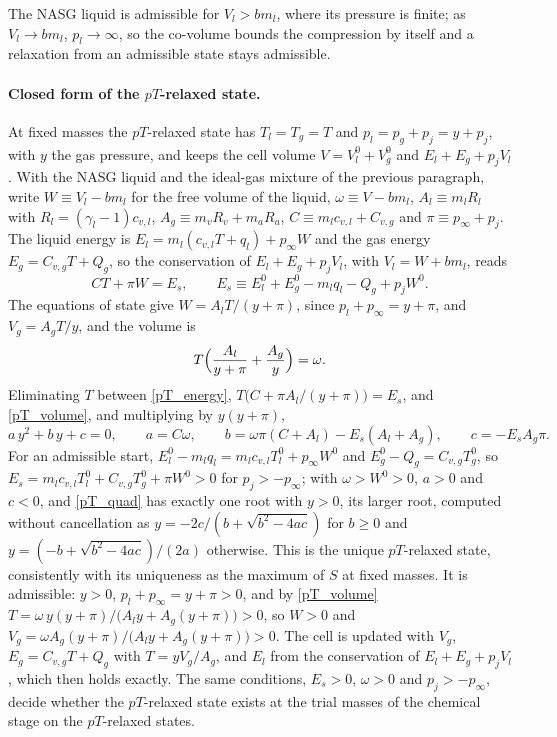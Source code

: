 The NASG liquid is admissible for $V_l>bm_l$, where its pressure is finite; as $V_l\to bm_l$, $p_l\to\infty$, so the co-volume bounds the compression by itself and a relaxation from an admissible state stays admissible.

\paragraph{Closed form of the $pT$-relaxed state.}
At fixed masses the $pT$-relaxed state has $T_l=T_g=T$ and $p_l=p_g+p_{j}=y+p_{j}$, with $y$ the gas pressure, and keeps the cell volume $V=V_l^0+V_g^0$ and $E_l+E_g+p_{j}V_l$. With the NASG liquid and the ideal-gas mixture of the previous paragraph, write $W\equiv V_l-bm_l$ for the free volume of the liquid, $\omega\equiv V-bm_l$, $A_l\equiv m_lR_l$ with $R_l=(\gamma_l-1)c_{v,l}$, $A_g\equiv m_vR_v+m_aR_a$, $C\equiv m_lc_{v,l}+C_{v,g}$ and $\pi\equiv p_\infty+p_{j}$. The liquid energy is $E_l=m_l(c_{v,l}T+q_l)+p_\infty W$ and the gas energy $E_g=C_{v,g}T+Q_g$, so the conservation of $E_l+E_g+p_{j}V_l$, with $V_l=W+bm_l$, reads
\begin{equation}\label{pT_energy}
CT+\pi W=E_s,\qquad E_s\equiv E_l^0+E_g^0-m_lq_l-Q_g+p_{j}W^0 .
\end{equation}
The equations of state give $W=A_lT/(y+\pi)$, since $p_l+p_\infty=y+\pi$, and $V_g=A_gT/y$, and the volume is
\begin{equation}\label{pT_volume}
T\Bigl(\frac{A_l}{y+\pi}+\frac{A_g}{y}\Bigr)=\omega .
\end{equation}
Eliminating $T$ between \eqref{pT_energy}, $T\bigl(C+\pi A_l/(y+\pi)\bigr)=E_s$, and \eqref{pT_volume}, and multiplying by $y(y+\pi)$,
\begin{equation}\label{pT_quad}
a\,y^2+b\,y+c=0,\qquad a=C\omega,\qquad b=\omega\pi(C+A_l)-E_s(A_l+A_g),\qquad c=-E_sA_g\pi .
\end{equation}
For an admissible start, $E_l^0-m_lq_l=m_lc_{v,l}T_l^0+p_\infty W^0$ and $E_g^0-Q_g=C_{v,g}T_g^0$, so $E_s=m_lc_{v,l}T_l^0+C_{v,g}T_g^0+\pi W^0>0$ for $p_{j}>-p_\infty$; with $\omega>W^0>0$, $a>0$ and $c<0$, and \eqref{pT_quad} has exactly one root with $y>0$, its larger root, computed without cancellation as $y=-2c/(b+\sqrt{b^2-4ac})$ for $b\ge0$ and $y=(-b+\sqrt{b^2-4ac})/(2a)$ otherwise. This is the unique $pT$-relaxed state, consistently with its uniqueness as the maximum of $S$ at fixed masses. It is admissible: $y>0$, $p_l+p_\infty=y+\pi>0$, and by \eqref{pT_volume} $T=\omega\,y(y+\pi)/\bigl(A_ly+A_g(y+\pi)\bigr)>0$, so $W>0$ and $V_g=\omega A_g(y+\pi)/\bigl(A_ly+A_g(y+\pi)\bigr)>0$. The cell is updated with $V_g$, $E_g=C_{v,g}T+Q_g$ with $T=yV_g/A_g$, and $E_l$ from the conservation of $E_l+E_g+p_{j}V_l$, which then holds exactly. The same conditions, $E_s>0$, $\omega>0$ and $p_{j}>-p_\infty$, decide whether the $pT$-relaxed state exists at the trial masses of the chemical stage on the $pT$-relaxed states.

